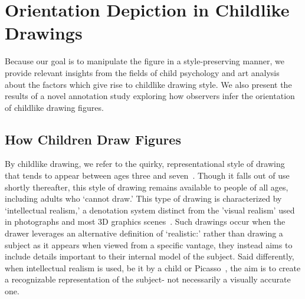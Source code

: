 \section{Orientation Depiction in Childlike Drawings}
Because our goal is to manipulate the figure in a style-preserving manner, we provide relevant insights from the fields of child psychology and art analysis about the factors which give rise to childlike drawing style. 
We also present the results of a novel annotation study exploring how observers infer the orientation of childlike drawing figures.



\subsection{How Children Draw Figures}

By childlike drawing, we refer to the quirky, representational style of drawing that tends to appear between ages three and seven~\cite{lowenfeld1975creative}. 
Though it falls out of use shortly thereafter, this style of drawing remains available to people of all ages, including adults who `cannot draw.'
This type of drawing is characterized by `intellectual realism,' a denotation system distinct from the 'visual realism' used in photographs and most 3D graphics scenes~\cite{luquet2001children}.
Such drawings occur when the drawer leverages an alternative definition of `realistic:' rather than drawing a subject as it appears when viewed from a specific vantage, they instead aims to include details important to their internal model of the subject.
Said differently, when intellectual realism is used, be it by a child or Picasso~\cite{picasso1937}, the aim is to create a recognizable representation of the subject- not necessarily a visually accurate one.





